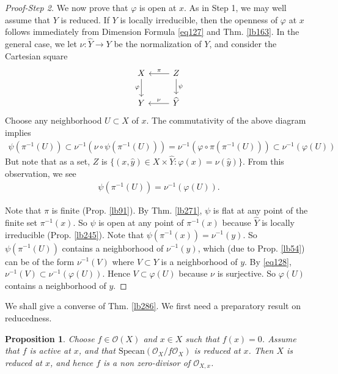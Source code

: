 \documentclass[12pt,b5paper,notitlepage]{report}
\theoremstyle{definition}
\theoremstyle{plain}
\newtheorem{pp}[df]{Proposition}
\newcommand{\wht}{\widehat}
\newcommand{\scr}{\mathscr}
\newcommand{\Specan}{\mathrm{Specan}}
\numberwithin{equation}{section}
\begin{document}
\begin{proof}[Proof-Step 2]
We now prove that $\varphi$ is open at $x$. As in Step 1, we may well assume that $Y$ is reduced. If $Y$ is locally irreducible, then the openness of $\varphi$ at $x$ follows immediately from Dimension Formula \eqref{eq127} and Thm. \ref{lb163}. In the general case, we let $\nu:\wht Y\rightarrow Y$ be the normalization of $Y$, and consider the Cartesian square
\begin{equation*}
\begin{tikzcd}
X \arrow[d, "\varphi"'] & Z \arrow[l, "\pi"'] \arrow[d, "\psi"] \\
Y                       & \wht Y \arrow[l, "\nu"']             
\end{tikzcd}
\end{equation*}
Choose any neighborhood $U\subset X$ of $x$. The commutativity of the above diagram implies
\begin{align*}
\psi(\pi^{-1}(U))\subset \nu^{-1}(\nu\circ\psi(\pi^{-1}(U)))=\nu^{-1}(\varphi\circ\pi(\pi^{-1}(U)))\subset\nu^{-1}(\varphi(U))
\end{align*}
But note that as a set, $Z$ is $\{(x,\wht y)\in X\times\wht Y:\varphi(x)=\nu(\wht y)\}$. From this observation, we see
\begin{align}
\psi(\pi^{-1}(U))=\nu^{-1}(\varphi(U)).  \label{eq128}
\end{align}

Note that $\pi$ is finite (Prop. \ref{lb91}). By Thm. \ref{lb271}, $\psi$ is flat at any point of the finite set $\pi^{-1}(x)$. So $\psi$ is open at any point of $\pi^{-1}(x)$ because $\wht Y$ is locally irreducible (Prop. \ref{lb245}). Note that $\psi(\pi^{-1}(x))=\nu^{-1}(y)$. So $\psi(\pi^{-1}(U))$ contains a neighborhood of $\nu^{-1}(y)$, which (due to Prop. \ref{lb54}) can be of the form $\nu^{-1}(V)$ where $V\subset Y$ is a neighborhood of $y$. By \eqref{eq128}, $\nu^{-1}(V)\subset\nu^{-1}(\varphi(U))$. Hence $V\subset \varphi(U)$ because $\nu$ is surjective. So $\varphi(U)$ contains a neighborhood of $y$. 
\end{proof}


We shall give a converse of Thm. \ref{lb286}. We first need a preparatory result on reducedness.

\begin{pp}\label{lb287}
Choose $f\in\scr O(X)$ and $x\in X$ such that $f(x)=0$. Assume that $f$ is active at $x$, and that $\Specan(\scr O_X/f\scr O_X)$ is reduced at $x$. Then $X$ is reduced at $x$, and hence $f$ is a non zero-divisor of $\scr O_{X,x}$.
\end{pp}
\end{document}
